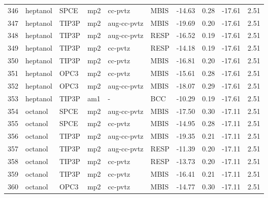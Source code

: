 \begin{tabular}{llllllrrrr}
346 &                       heptanol &       SPCE &      mp2 &      cc-pvtz &         MBIS & -14.63 &      0.28 &      -17.61 &     2.51 \\
347 &                       heptanol &      TIP3P &      mp2 &  aug-cc-pvtz &         MBIS & -19.69 &      0.20 &      -17.61 &     2.51 \\
348 &                       heptanol &      TIP3P &      mp2 &  aug-cc-pvtz &         RESP & -16.52 &      0.19 &      -17.61 &     2.51 \\
349 &                       heptanol &      TIP3P &      mp2 &      cc-pvtz &         RESP & -14.18 &      0.19 &      -17.61 &     2.51 \\
350 &                       heptanol &      TIP3P &      mp2 &      cc-pvtz &         MBIS & -16.81 &      0.20 &      -17.61 &     2.51 \\
351 &                       heptanol &       OPC3 &      mp2 &      cc-pvtz &         MBIS & -15.61 &      0.28 &      -17.61 &     2.51 \\
352 &                       heptanol &       OPC3 &      mp2 &  aug-cc-pvtz &         MBIS & -18.07 &      0.29 &      -17.61 &     2.51 \\
353 &                       heptanol &      TIP3P &      am1 &            - &          BCC & -10.29 &      0.19 &      -17.61 &     2.51 \\
354 &                        octanol &       SPCE &      mp2 &  aug-cc-pvtz &         MBIS & -17.50 &      0.30 &      -17.11 &     2.51 \\
355 &                        octanol &       SPCE &      mp2 &      cc-pvtz &         MBIS & -14.95 &      0.28 &      -17.11 &     2.51 \\
356 &                        octanol &      TIP3P &      mp2 &  aug-cc-pvtz &         MBIS & -19.35 &      0.21 &      -17.11 &     2.51 \\
357 &                        octanol &      TIP3P &      mp2 &  aug-cc-pvtz &         RESP & -11.39 &      0.20 &      -17.11 &     2.51 \\
358 &                        octanol &      TIP3P &      mp2 &      cc-pvtz &         RESP & -13.73 &      0.20 &      -17.11 &     2.51 \\
359 &                        octanol &      TIP3P &      mp2 &      cc-pvtz &         MBIS & -16.41 &      0.21 &      -17.11 &     2.51 \\
360 &                        octanol &       OPC3 &      mp2 &      cc-pvtz &         MBIS & -14.77 &      0.30 &      -17.11 &     2.51 \\

\end{tabular}
